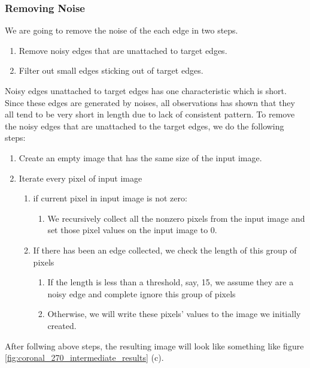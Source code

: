 \subsubsection{Removing Noise}

We are going to remove the noise of the each edge in two steps. 
\begin{enumerate}
  \item Remove noisy edges that are unattached to target edges.
  \item Filter out small edges sticking out of target edges. 
\end{enumerate}

Noisy edges unattached to target edges has one characteristic which is short. Since these edges are generated
by noises, all observations has shown that they all tend to be very short in length due to lack of consistent
pattern. To remove the noisy edges that are unattached to the target edges, we do the following steps:
\begin{enumerate}
  \item Create an empty image that has the same size of the input image.
  \item Iterate every pixel of input image
    \begin{enumerate}
      \item if current pixel in input image is not zero:
        \begin{enumerate}
          \item We recursively collect all the nonzero pixels from the input image and set those pixel values on
            the input image to 0.
        \end{enumerate}
      \item If there has been an edge collected, we check the length of this group of pixels
        \begin{enumerate}
          \item If the length is less than a threshold, say, 15, we assume they are a noisy edge and 
            complete ignore this group of pixels
          \item Otherwise, we will write these pixels' values to the image we initially created.
        \end{enumerate}
    \end{enumerate}
\end{enumerate}

After follwing above steps, the resulting image will look like something like figure 
\ref{fig:coronal_270_intermediate_results} (c).

